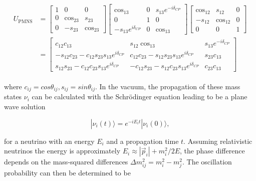 \documentclass[a4paper,12pt,numbered]{article}
\begin{document}
\begin{align}
\begin{split}
    U_{\text{PMNS}} &= 
    \begin{bmatrix}
        1 & 0 & 0 \\
        0 & \cos_{23} & s_{23} \\
        0 & -s_{23} & \cos_{23}
    \end{bmatrix}
    \begin{bmatrix}
        \cos_{13} & 0 & s_{13} e^{-i\delta_{CP}} \\
        0 & 1 & 0 \\
        -s_{13} e^{i\delta_{CP}} & 0 & \cos_{13}
    \end{bmatrix}
    \begin{bmatrix}
        \cos_{12} & s_{12} & 0 \\
        -s_{12} & \cos_{12} & 0 \\
        0 & 0 & 1
    \end{bmatrix}
    \\
    &=
    \begin{bmatrix}
        c_{12} c_{13} & s_{12} \cos_{13} & s_{13} e^{-i\delta_{CP}} \\
        -s_{12} c_{23} - c_{12} s_{23} s_{13} e^{i\delta_{CP}} & 
        c_{12} c_{23} - s_{12} s_{23} s_{13} e^{i\delta_{CP}} & 
        s_{23} c_{13} \\
        s_{12} s_{23} - c_{12} c_{23} s_{13} e^{i\delta_{CP}} & 
        -c_{12} s_{23} - s_{12} c_{23} s_{13} e^{i\delta_{CP}} & 
        c_{23} c_{13}
    \end{bmatrix}
\end{split}
\end{align}

where $c_{ij}=cos\theta_{ij}, s_{ij}=sin\theta_{ij}$. In the vacuum, the propagation of these mass states $\nu_i$ can be calculated with the Schrödinger equation leading to be a plane wave solution

\begin{equation}
    |\nu_i(t)\rangle = e^{-i E_i t} |\nu_i(0)\rangle,
\end{equation}

for a neutrino with an energy $E_i$ and a propagation time $t$. Assuming relativistic neutrinos the energy is approximately $E_i \approx |\vec{p}_i| + m_i^2 / 2E$, the phase difference depends on the mass-squared differences $\Delta m_{ij}^2 = m_i^2 - m_j^2$. The oscillation probability can then be determined to be
\end{document}
